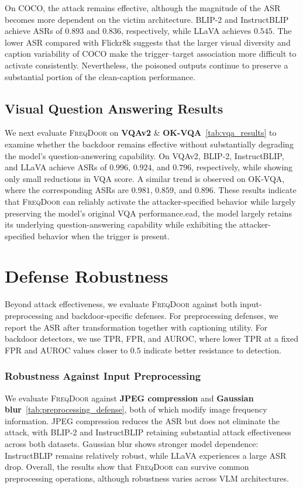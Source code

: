 \documentclass[lettersize,journal]{IEEEtran}
\begin{document}
On COCO, the attack remains effective, although the magnitude of the ASR becomes more dependent on the victim architecture. BLIP-2 and InstructBLIP achieve ASRs of $0.893$ and $0.836$, respectively, while LLaVA achieves $0.545$. The lower ASR compared with Flickr8k suggests that the larger visual diversity and caption variability of COCO make the trigger--target association more difficult to activate consistently. Nevertheless, the poisoned outputs continue to preserve a substantial portion of the clean-caption performance.

\subsection{Visual Question Answering Results}
We next evaluate \textsc{FreqDoor} on \textbf{VQAv2} \& \textbf{OK-VQA}~\ref{tab:vqa_results} to examine whether the backdoor remains effective without substantially degrading the model's question-answering capability. On VQAv2, BLIP-2, InstructBLIP, and LLaVA achieve ASRs of $0.996$, $0.924$, and $0.796$, respectively, while showing only small reductions in VQA score. A similar trend is observed on OK-VQA, where the corresponding ASRs are $0.981$, $0.859$, and $0.896$. These results indicate that \textsc{FreqDoor} can reliably activate the attacker-specified behavior while largely preserving the model's original VQA performance.ead, the model largely retains its underlying question-answering capability while exhibiting the attacker-specified behavior when the trigger is present.


\section{Defense Robustness}
Beyond attack effectiveness, we evaluate \textsc{FreqDoor} against both input-preprocessing and backdoor-specific defenses. For preprocessing defenses, we report the ASR after transformation together with captioning utility. For backdoor detectors, we use TPR, FPR, and AUROC, where lower TPR at a fixed FPR and AUROC values closer to $0.5$ indicate better resistance to detection.
\subsubsection{Robustness Against Input Preprocessing}
We evaluate \textsc{FreqDoor} against \textbf{JPEG compression} and \textbf{Gaussian blur}~\ref{tab:preprocessing_defense}, both of which modify image frequency information. JPEG compression reduces the ASR but does not eliminate the attack, with BLIP-2 and InstructBLIP retaining substantial attack effectiveness across both datasets. Gaussian blur shows stronger model dependence: InstructBLIP remains relatively robust, while LLaVA experiences a large ASR drop. Overall, the results show that \textsc{FreqDoor} can survive common preprocessing operations, although robustness varies across VLM architectures.
\end{document}
